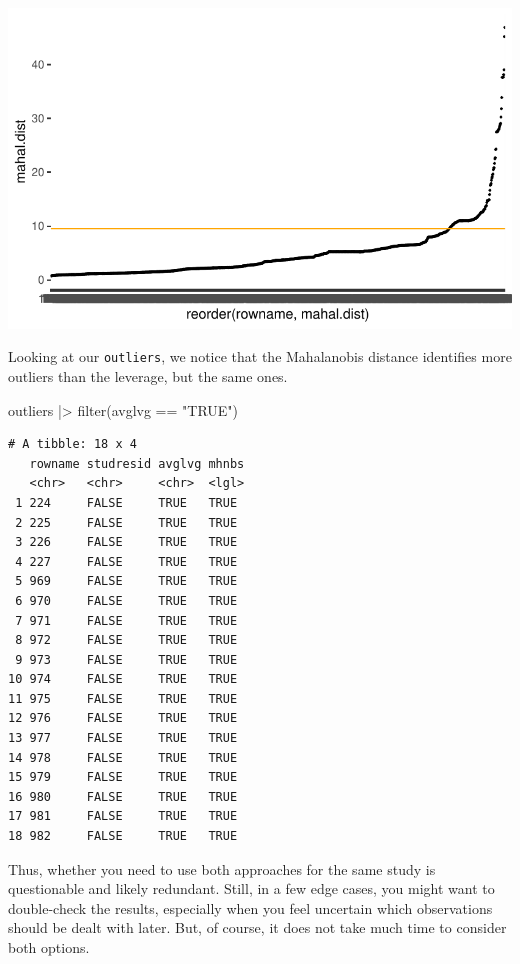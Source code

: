 \documentclass[
  letterpaper,
]{krantz}
\makeatletter
\newenvironment{Shaded}{\begin{snugshade}}{\end{snugshade}}
\newcommand{\FunctionTok}[1]{\textcolor[rgb]{0.28,0.35,0.67}{#1}}
\newcommand{\NormalTok}[1]{\textcolor[rgb]{0.00,0.23,0.31}{#1}}
\newcommand{\SpecialCharTok}[1]{\textcolor[rgb]{0.37,0.37,0.37}{#1}}
\newcommand{\StringTok}[1]{\textcolor[rgb]{0.13,0.47,0.30}{#1}}
\newenvironment{kframe}{%
\medskip{}
\setlength{\fboxsep}{.8em}
 \def\at@end@of@kframe{}%
 \ifinner\ifhmode%
  \def\at@end@of@kframe{\end{minipage}}%
  \begin{minipage}{\columnwidth}%
 \fi\fi%
 \def\FrameCommand##1{\hskip\@totalleftmargin \hskip-\fboxsep
 \colorbox{shadecolor}{##1}\hskip-\fboxsep
     \hskip-\linewidth \hskip-\@totalleftmargin \hskip\columnwidth}%
 \MakeFramed {\advance\hsize-\width
   \@totalleftmargin\z@ \linewidth\hsize
   \@setminipage}}%
 {\par\unskip\endMakeFramed%
 \at@end@of@kframe}
\renewenvironment{Shaded}{\begin{kframe}}{\end{kframe}}
\makeatother
\begin{document}
\includegraphics{13_regressions_files/figure-latex/mahalanobis-distance-plot-1.pdf}

Looking at our \texttt{outliers}, we notice that the Mahalanobis
distance identifies more outliers than the leverage, but the same ones.

\begin{Shaded}
\begin{Highlighting}[]
\NormalTok{outliers }\SpecialCharTok{|\textgreater{}} \FunctionTok{filter}\NormalTok{(avglvg }\SpecialCharTok{==} \StringTok{"TRUE"}\NormalTok{)}
\end{Highlighting}
\end{Shaded}

\begin{verbatim}
# A tibble: 18 x 4
   rowname studresid avglvg mhnbs
   <chr>   <chr>     <chr>  <lgl>
 1 224     FALSE     TRUE   TRUE 
 2 225     FALSE     TRUE   TRUE 
 3 226     FALSE     TRUE   TRUE 
 4 227     FALSE     TRUE   TRUE 
 5 969     FALSE     TRUE   TRUE 
 6 970     FALSE     TRUE   TRUE 
 7 971     FALSE     TRUE   TRUE 
 8 972     FALSE     TRUE   TRUE 
 9 973     FALSE     TRUE   TRUE 
10 974     FALSE     TRUE   TRUE 
11 975     FALSE     TRUE   TRUE 
12 976     FALSE     TRUE   TRUE 
13 977     FALSE     TRUE   TRUE 
14 978     FALSE     TRUE   TRUE 
15 979     FALSE     TRUE   TRUE 
16 980     FALSE     TRUE   TRUE 
17 981     FALSE     TRUE   TRUE 
18 982     FALSE     TRUE   TRUE 
\end{verbatim}

Thus, whether you need to use both approaches for the same study is
questionable and likely redundant. Still, in a few edge cases, you might
want to double-check the results, especially when you feel uncertain
which observations should be dealt with later. But, of course, it does
not take much time to consider both options.
\end{document}
